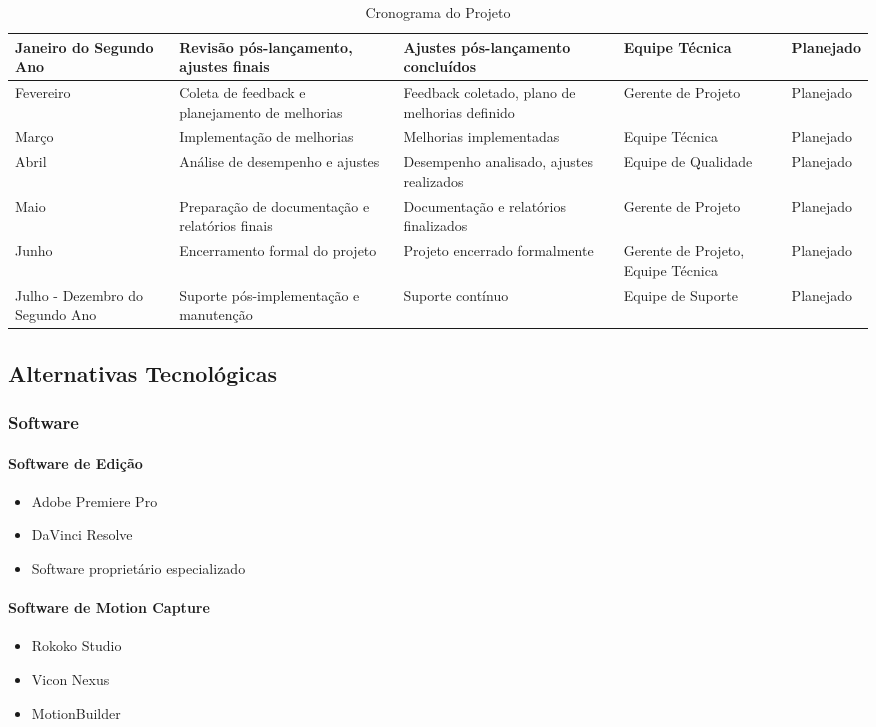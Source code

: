 \begin{table}[H]
\begin{tabular}{|p{2cm}|p{4cm}|p{3cm}|p{3cm}|p{2cm}|}
Janeiro do Segundo Ano & Revisão pós-lançamento, ajustes finais & Ajustes pós-lançamento concluídos & Equipe Técnica & Planejado \\ \hline
Fevereiro & Coleta de feedback e planejamento de melhorias & Feedback coletado, plano de melhorias definido & Gerente de Projeto & Planejado \\ \hline
Março & Implementação de melhorias & Melhorias implementadas & Equipe Técnica & Planejado \\ \hline
Abril & Análise de desempenho e ajustes & Desempenho analisado, ajustes realizados & Equipe de Qualidade & Planejado \\ \hline
Maio & Preparação de documentação e relatórios finais & Documentação e relatórios finalizados & Gerente de Projeto & Planejado \\ \hline
Junho & Encerramento formal do projeto & Projeto encerrado formalmente & Gerente de Projeto, Equipe Técnica & Planejado \\ \hline
Julho - Dezembro do Segundo Ano & Suporte pós-implementação e manutenção & Suporte contínuo & Equipe de Suporte & Planejado \\ \hline
\end{tabular}
\caption{Cronograma do Projeto}
\label{tab:cronograma}
\end{table}



\subsection{Alternativas Tecnológicas}

\subsubsection{Software}

\paragraph{Software de Edição}
\begin{itemize}
    \item Adobe Premiere Pro
    \item DaVinci Resolve
    \item Software proprietário especializado
\end{itemize}

\paragraph{Software de Motion Capture}
\begin{itemize}
    \item Rokoko Studio
    \item Vicon Nexus
    \item MotionBuilder
\end{itemize}

